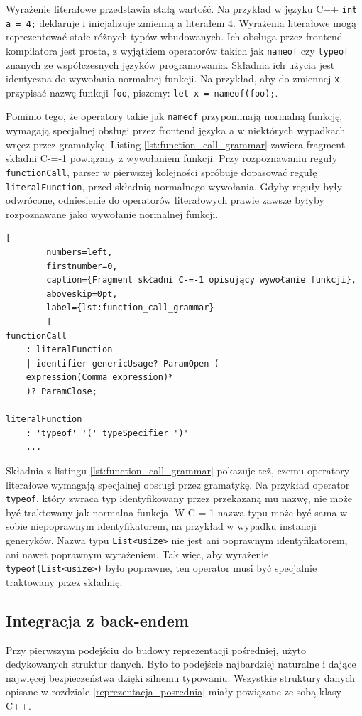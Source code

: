 Wyrażenie literałowe przedstawia stałą wartość.
Na przykład w języku C++ \lstinline{int a = 4;} deklaruje i inicjalizuje zmienną a literałem 4.
Wyrażenia literałowe mogą reprezentować stałe różnych typów wbudowanych.
Ich obsługa przez frontend kompilatora jest prosta, z wyjątkiem operatorów takich jak \lstinline{nameof} czy \lstinline{typeof} znanych ze współczesnych języków programowania.
Składnia ich użycia jest identyczna do wywołania normalnej funkcji.
Na przykład, aby do zmiennej \lstinline{x} przypisać nazwę funkcji \lstinline{foo}, piszemy: \lstinline{let x = nameof(foo);}.


Pomimo tego, że operatory takie jak \lstinline{nameof} przypominają normalną funkcję, wymagają specjalnej obsługi przez frontend języka a w niektórych wypadkach wręcz przez gramatykę.
Listing \ref{lst:function_call_grammar} zawiera fragment składni C-=-1 powiązany z wywołaniem funkcji.
Przy rozpoznawaniu reguły \lstinline{functionCall}, parser w pierwszej kolejności spróbuje dopasować regułę \lstinline{literalFunction}, przed składnią normalnego wywołania.
Gdyby reguły były odwrócone, odniesienie do operatorów literałowych prawie zawsze byłyby rozpoznawane jako wywołanie normalnej funkcji.

\begin{minipage}{\linewidth}
	\begin{lstlisting}[
		numbers=left,
		firstnumber=0,
		caption={Fragment składni C-=-1 opisujący wywołanie funkcji},
		aboveskip=0pt,
		label={lst:function_call_grammar}
		]
functionCall
	: literalFunction
	| identifier genericUsage? ParamOpen (
	expression(Comma expression)*
	)? ParamClose;

literalFunction
	: 'typeof' '(' typeSpecifier ')'
	...
	\end{lstlisting}
\end{minipage}


Składnia z listingu \ref{lst:function_call_grammar} pokazuje też, czemu operatory literałowe wymagają specjalnej obsługi przez gramatykę.
Na przykład operator \lstinline{typeof}, który zwraca typ identyfikowany przez przekazaną mu nazwę, nie może być traktowany jak normalna funkcja.
W C-=-1 nazwa typu może być sama w sobie niepoprawnym identyfikatorem, na przykład w wypadku instancji generyków.
Nazwa typu \lstinline{List<usize>} nie jest ani poprawnym identyfikatorem, ani nawet poprawnym wyrażeniem.
Tak więc, aby wyrażenie \lstinline{typeof(List<usize>)} było poprawne, ten operator musi być specjalnie traktowany przez składnię.

\subsection{Integracja z back-endem}
\label{backend_integration}
Przy pierwszym podejściu do budowy reprezentacji pośredniej, użyto dedykowanych struktur danych. Było to podejście najbardziej naturalne i dające najwięcej bezpieczeństwa dzięki silnemu typowaniu. Wszystkie struktury danych opisane w rozdziale \ref{reprezentacja_posrednia} miały powiązane ze sobą klasy C++.


